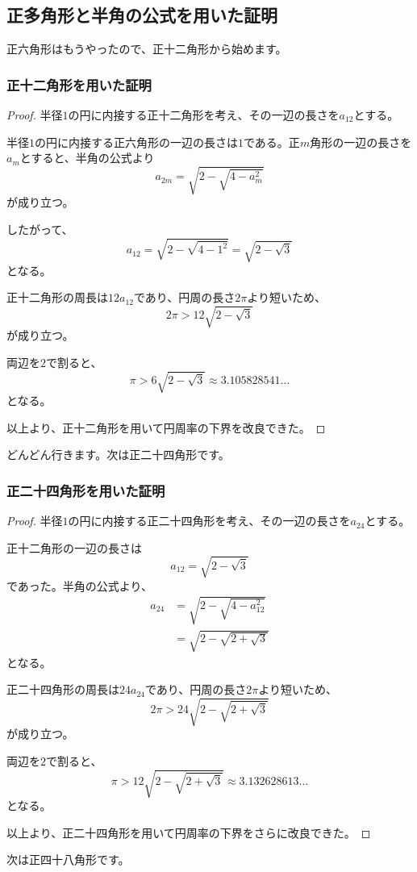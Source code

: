 \documentclass[dvipdfmx]{jlreq}
\begin{document}
\subsection{正多角形と半角の公式を用いた証明}
正六角形はもうやったので、正十二角形から始めます。
\subsubsection{正十二角形を用いた証明}
\begin{proof}
半径$1$の円に内接する正十二角形を考え、その一辺の長さを$a_{12}$とする。

半径$1$の円に内接する正六角形の一辺の長さは$1$である。正$m$角形の一辺の長さを$a_m$とすると、半角の公式より
\[
a_{2m}=\sqrt{2-\sqrt{4-a_m^2}}
\]
が成り立つ。

したがって、
\[
a_{12}=\sqrt{2-\sqrt{4-1^2}}
=\sqrt{2-\sqrt{3}}
\]
となる。

正十二角形の周長は$12a_{12}$であり、円周の長さ$2\pi$より短いため、
\[
2\pi>12\sqrt{2-\sqrt{3}}
\]
が成り立つ。

両辺を$2$で割ると、
\[
\pi>6\sqrt{2-\sqrt{3}}
\approx3.105828541\dots
\]
となる。

以上より、正十二角形を用いて円周率の下界を改良できた。
\end{proof}
どんどん行きます。次は正二十四角形です。
\subsubsection{正二十四角形を用いた証明}
\begin{proof}
半径$1$の円に内接する正二十四角形を考え、その一辺の長さを$a_{24}$とする。

正十二角形の一辺の長さは
\[
a_{12}=\sqrt{2-\sqrt{3}}
\]
であった。半角の公式より、
\[
\begin{aligned}
a_{24}
&=\sqrt{2-\sqrt{4-a_{12}^2}}\\
&=\sqrt{2-\sqrt{2+\sqrt{3}}}
\end{aligned}
\]
となる。

正二十四角形の周長は$24a_{24}$であり、円周の長さ$2\pi$より短いため、
\[
2\pi>24\sqrt{2-\sqrt{2+\sqrt{3}}}
\]
が成り立つ。

両辺を$2$で割ると、
\[
\pi>12\sqrt{2-\sqrt{2+\sqrt{3}}}
\approx3.132628613\dots
\]
となる。

以上より、正二十四角形を用いて円周率の下界をさらに改良できた。
\end{proof}
次は正四十八角形です。
\end{document}
